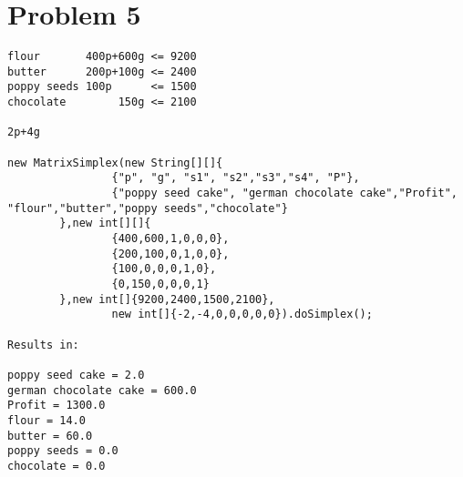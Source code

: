 \documentclass[11pt,a4paper,openany]{report}
\begin{document}
\section*{Problem 5}
\begin{verbatim}
flour       400p+600g <= 9200
butter      200p+100g <= 2400
poppy seeds 100p      <= 1500
chocolate        150g <= 2100

2p+4g

new MatrixSimplex(new String[][]{
                {"p", "g", "s1", "s2","s3","s4", "P"},
                {"poppy seed cake", "german chocolate cake","Profit", "flour","butter","poppy seeds","chocolate"}
        },new int[][]{
                {400,600,1,0,0,0},
                {200,100,0,1,0,0},
                {100,0,0,0,1,0},
                {0,150,0,0,0,1}
        },new int[]{9200,2400,1500,2100},
                new int[]{-2,-4,0,0,0,0,0}).doSimplex();

Results in:

poppy seed cake = 2.0
german chocolate cake = 600.0
Profit = 1300.0
flour = 14.0
butter = 60.0
poppy seeds = 0.0
chocolate = 0.0
\end{verbatim}
\end{document}
